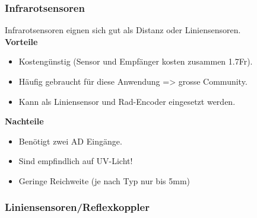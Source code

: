\subsubsection{Infrarotsensoren}
Infrarotsensoren eignen sich gut als Distanz oder Liniensensoren.\\
\textbf {Vorteile}
\begin{itemize}
\item Kostengünstig (Sensor und Empfänger kosten zusammen 1.7Fr).
\item Häufig gebraucht für diese Anwendung => grosse Community.
\item Kann als Liniensensor und Rad-Encoder eingesetzt werden.\\
\end{itemize}
\textbf {Nachteile}
\begin{itemize}
\item Benötigt zwei AD Eingänge.
\item Sind empfindlich auf UV-Licht!
\item Geringe Reichweite (je nach Typ nur bis 5mm)
\end{itemize}

\subsubsection{Liniensensoren/Reflexkoppler}

